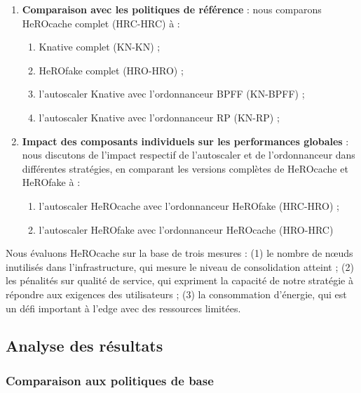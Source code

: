 {\begin{enumerate}
    \item \textbf{Comparaison avec les politiques de référence} : nous comparons HeROcache complet (HRC-HRC) à :
    \begin{enumerate}
        \item Knative complet (KN-KN) ;
        \item HeROfake complet (HRO-HRO) ;
        \item l'autoscaler Knative avec l'ordonnanceur BPFF (KN-BPFF) ;
        \item l'autoscaler Knative avec l'ordonnanceur RP (KN-RP) ;
    \end{enumerate}
    \item \textbf{Impact des composants individuels sur les performances globales} : nous discutons de l'impact respectif de l'autoscaler et de l'ordonnanceur dans différentes stratégies, en comparant les versions complètes de HeROcache et HeROfake à :
    \begin{enumerate}
        \item l'autoscaler HeROcache avec l'ordonnanceur HeROfake (HRC-HRO) ;
        \item l'autoscaler HeROfake avec l'ordonnanceur HeROcache (HRO-HRC)
    \end{enumerate}
\end{enumerate}

Nous évaluons HeROcache sur la base de trois mesures : (1) le nombre de nœuds inutilisés dans l'infrastructure, qui mesure le niveau de consolidation atteint ; (2) les pénalités sur qualité de service, qui expriment la capacité de notre stratégie à répondre aux exigences des utilisateurs ; (3) la consommation d'énergie, qui est un défi important à l'edge avec des ressources limitées.

\subsection{Analyse des résultats}

\subsubsection{Comparaison aux politiques de base}

}
